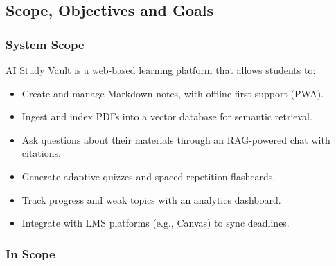 \documentclass[12pt,a4paper]{article}
\begin{document}
\subsection{Scope, Objectives and Goals}

\subsubsection{System Scope}

AI Study Vault is a web-based learning platform that allows students to:

\begin{itemize}
    \item Create and manage Markdown notes, with offline-first support (PWA).
    \item Ingest and index PDFs into a vector database for semantic retrieval.
    \item Ask questions about their materials through an RAG-powered chat with citations.
    \item Generate adaptive quizzes and spaced-repetition flashcards.
    \item Track progress and weak topics with an analytics dashboard.
    \item Integrate with LMS platforms (e.g., Canvas) to sync deadlines.
\end{itemize}

\subsubsection{In Scope}
\end{document}
